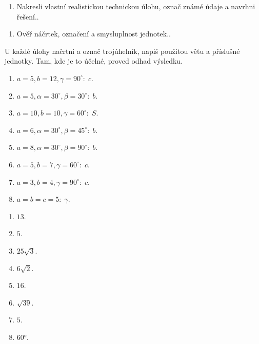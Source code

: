 \documentclass[11pt,a4paper]{article}
\begin{document}
\begin{zadaniReseniBox}[title={Rozšíření 1}]
\begin{enumerate}[label=\alph*)]
\item Nakresli vlastní realistickou technickou úlohu, označ známé údaje a navrhni řešení..
\end{enumerate}
\tcblower
\begin{enumerate}[label=\alph*)]
\item Ověř náčrtek, označení a smysluplnost jednotek..
\end{enumerate}
\end{zadaniReseniBox}
U každé úlohy načrtni a označ trojúhelník, napiš použitou větu a příslušné jednotky. Tam, kde je to účelné, proveď odhad výsledku.
\begin{zadaniReseniBox}[title={Domácí úkol}]
\begin{enumerate}[label=\alph*)]
\item $a=5,b=12,\gamma=90^\circ:\;c$.
\item $a=5,\alpha=30^\circ,\beta=30^\circ:\;b$.
\item $a=10,b=10,\gamma=60^\circ:\;S$.
\item $a=6,\alpha=30^\circ,\beta=45^\circ:\;b$.
\item $a=8,\alpha=30^\circ,\beta=90^\circ:\;b$.
\item $a=5,b=7,\gamma=60^\circ:\;c$.
\item $a=3,b=4,\gamma=90^\circ:\;c$.
\item $a=b=c=5:\;\gamma$.
\end{enumerate}
\tcblower
\begin{enumerate}[label=\alph*)]
\item $13$.
\item $5$.
\item $25\sqrt3$.
\item $6\sqrt2$.
\item $16$.
\item $\sqrt{39}$.
\item $5$.
\item $60°$.
\end{enumerate}
\end{zadaniReseniBox}
\end{document}
